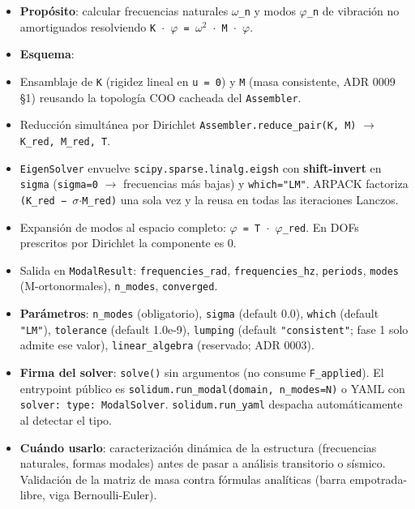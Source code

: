 \documentclass[11pt,letterpaper,oneside]{report}
\begin{document}
\begin{itemize}
  \item \textbf{Propósito}: calcular frecuencias naturales \texttt{\ensuremath{\omega}\_n} y modos \texttt{\ensuremath{\varphi}\_n} de vibración no amortiguados resolviendo \texttt{K \ensuremath{\cdot} \ensuremath{\varphi} = \ensuremath{\omega}\ensuremath{^{2}} \ensuremath{\cdot} M \ensuremath{\cdot} \ensuremath{\varphi}}.
  \item \textbf{Esquema}:
  \item Ensamblaje de \texttt{K} (rigidez lineal en \texttt{u = 0}) y \texttt{M} (masa consistente, ADR 0009 §1) reusando la topología COO cacheada del \texttt{Assembler}.
  \item Reducción simultánea por Dirichlet \texttt{Assembler.reduce\_pair(K, M)} \ensuremath{\to} \texttt{K\_red, M\_red, T}.
  \item \texttt{EigenSolver} envuelve \texttt{scipy.sparse.linalg.eigsh} con \textbf{shift-invert} en \texttt{sigma} (\texttt{sigma=0} \ensuremath{\to} frecuencias más bajas) y \texttt{which="LM"}. ARPACK factoriza \texttt{(K\_red − \ensuremath{\sigma}\ensuremath{\cdot}M\_red)} una sola vez y la reusa en todas las iteraciones Lanczos.
  \item Expansión de modos al espacio completo: \texttt{\ensuremath{\varphi} = T \ensuremath{\cdot} \ensuremath{\varphi}\_red}. En DOFs prescritos por Dirichlet la componente es 0.
  \item Salida en \texttt{ModalResult}: \texttt{frequencies\_rad}, \texttt{frequencies\_hz}, \texttt{periods}, \texttt{modes} (M-ortonormales), \texttt{n\_modes}, \texttt{converged}.
  \item \textbf{Parámetros}: \texttt{n\_modes} (obligatorio), \texttt{sigma} (default 0.0), \texttt{which} (default \texttt{"LM"}), \texttt{tolerance} (default 1.0e-9), \texttt{lumping} (default \texttt{"consistent"}; fase 1 solo admite ese valor), \texttt{linear\_algebra} (reservado; ADR 0003).
  \item \textbf{Firma del solver}: \texttt{solve()} sin argumentos (no consume \texttt{F\_applied}). El entrypoint público es \texttt{solidum.run\_modal(domain, n\_modes=N)} o YAML con \texttt{solver: type: ModalSolver}. \texttt{solidum.run\_yaml} despacha automáticamente al detectar el tipo.
  \item \textbf{Cuándo usarlo}: caracterización dinámica de la estructura (frecuencias naturales, formas modales) antes de pasar a análisis transitorio o sísmico. Validación de la matriz de masa contra fórmulas analíticas (barra empotrada-libre, viga Bernoulli-Euler).

\end{itemize}
\end{document}
